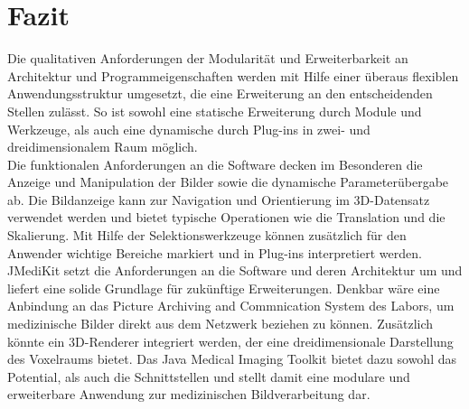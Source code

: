 \chapter{Fazit}
Die qualitativen Anforderungen der Modularität und Erweiterbarkeit an Architektur und Programmeigenschaften werden mit Hilfe einer überaus flexiblen Anwendungsstruktur umgesetzt, die eine Erweiterung an den entscheidenden Stellen zulässt. So ist sowohl eine statische Erweiterung durch Module und Werkzeuge, als auch eine dynamische durch Plug-ins in zwei- und dreidimensionalem Raum möglich.\\
Die funktionalen Anforderungen an die Software decken im Besonderen die Anzeige und Manipulation der Bilder sowie die dynamische Parameterübergabe ab. Die Bildanzeige kann zur Navigation und Orientierung im 3D-Datensatz verwendet werden und bietet typische Operationen wie die Translation und die Skalierung. Mit Hilfe der Selektionswerkzeuge können zusätzlich für den Anwender wichtige Bereiche markiert und in Plug-ins interpretiert werden.\\
JMediKit setzt die Anforderungen an die Software und deren Architektur um und liefert eine solide Grundlage für zukünftige Erweiterungen. Denkbar wäre eine Anbindung an das Picture Archiving and Commnication System des Labors, um medizinische Bilder direkt aus dem Netzwerk beziehen zu können. Zusätzlich könnte ein 3D-Renderer integriert werden, der eine dreidimensionale Darstellung des Voxelraums bietet.
Das Java Medical Imaging Toolkit bietet dazu sowohl das Potential, als auch die Schnittstellen und stellt damit eine modulare und erweiterbare Anwendung zur medizinischen Bildverarbeitung dar.
